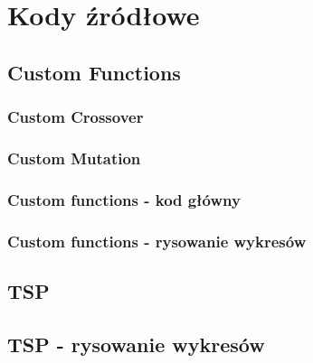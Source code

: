 \section{Kody źródłowe}

\subsection{Custom Functions}

\subsubsection{Custom Crossover}

\subsubsection{Custom Mutation}

\subsubsection{Custom functions - kod główny}

\subsubsection{Custom functions - rysowanie wykresów}


\subsection{TSP}


\subsection{TSP - rysowanie wykresów}

